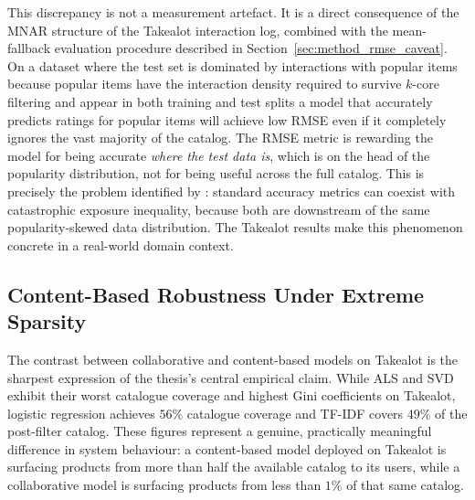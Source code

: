 \documentclass[11pt,a4paper]{report}
\begin{document}
This discrepancy is not a measurement artefact. It is a direct consequence of the MNAR structure of the Takealot interaction log, combined with the mean-fallback evaluation procedure described in Section~\ref{sec:method_rmse_caveat}. On a dataset where the test set is dominated by interactions with popular items because popular items have the interaction density required to survive $k$-core filtering and appear in both training and test splits a model that accurately predicts ratings for popular items will achieve low RMSE even if it completely ignores the vast majority of the catalog. The RMSE metric is rewarding the model for being accurate \emph{where the test data is}, which is on the head of the popularity distribution, not for being useful across the full catalog. This is precisely the problem identified by \citet{steck2011itempopularity}: standard accuracy metrics can coexist with catastrophic exposure inequality, because both are downstream of the same popularity-skewed data distribution. The Takealot results make this phenomenon concrete in a real-world domain context.

\subsection*{Content-Based Robustness Under Extreme Sparsity}

The contrast between collaborative and content-based models on Takealot is the sharpest expression of the thesis's central empirical claim. While ALS and SVD exhibit their worst catalogue coverage and highest Gini coefficients on Takealot, logistic regression achieves $56\%$ catalogue coverage and TF-IDF covers $49\%$ of the post-filter catalog. These figures represent a genuine, practically meaningful difference in system behaviour: a content-based model deployed on Takealot is surfacing products from more than half the available catalog to its users, while a collaborative model is surfacing products from less than $1\%$ of that same catalog.
\end{document}
